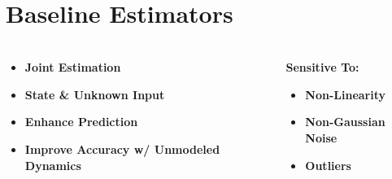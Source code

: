 \documentclass[handout, aspectratio=169]{beamer}
\begin{document}
\section{Baseline Estimators}
\begin{frame}
  \frametitle{}
  \begin{columns}[T]
    \begin{column}{0.65\textwidth}
        \begin{tcolorbox}[colbacktitle=greentitle, title=\textbf{Core Idea}]
            \begin{itemize}
                \item<1-> \textbf{Joint Estimation} \pause
                \item<2-> \textbf{State \& Unknown Input} \pause
                \item<3-> \textbf{Enhance Prediction} \pause
                \item<4-> \textbf{Improve Accuracy w/ Unmodeled Dynamics}
            \end{itemize}
        \end{tcolorbox}
    \end{column}
    \begin{column}{0.35\textwidth}
        \begin{tcolorbox}[colbacktitle=redtitle, title=\textbf{Key Limitation}]
             \textbf{Sensitive To:}
                \begin{itemize}
                    \item<5-> \textbf{Non-Linearity} \pause
                    \item<6-> \textbf{Non-Gaussian Noise} \pause
                    \item<7-> \textbf{Outliers}
                \end{itemize}
        \end{tcolorbox}
     \end{column}
 \end{columns}
\end{frame}
\end{document}
